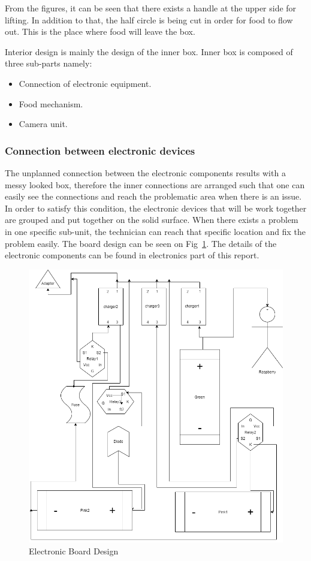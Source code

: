From the figures, it can be seen that there exists a handle at the upper side for lifting. In addition to that, the half circle is being cut in order for food to flow out. This is the place where food will leave the box. 

Interior design is mainly the design of the inner box. Inner box is composed of three sub-parts namely:

\begin{itemize}
    \item Connection of electronic equipment.
    \item Food mechanism.
    \item Camera unit.
\end{itemize}

\subsubsection{Connection between electronic devices}
The unplanned connection between the electronic components results with a messy looked box, therefore the inner connections are arranged such that one can easily see the connections and reach the problematic area when there is an issue. In order to satisfy this condition, the electronic devices that will be work together are grouped and put together on the solid surface. When there exists a problem in one specific sub-unit, the technician can reach that specific location and fix the problem easily. The board design can be seen on Fig~\ref{fig:Board}. The details of the electronic components can be found in electronics part of this report.
\begin{figure}[ht] 
     \centering
     \includegraphics[width=0.9\linewidth]{content/060_mechanical_design/ElectronicBoardDesign.png}
     \caption{Electronic Board Design}
     \label{fig:Board}
\end{figure}
\clearpage 

